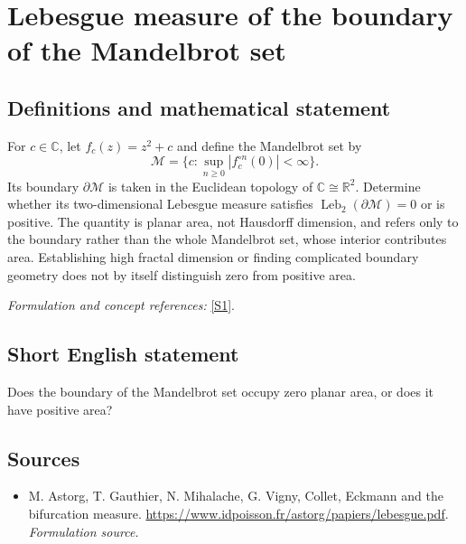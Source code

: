 \documentclass[11pt]{article}
\begin{document}
\section*{\texorpdfstring{Lebesgue measure of the boundary of the Mandelbrot set}{Lebesgue measure of the boundary of the Mandelbrot set}}\label{420}
\subsection{Definitions and mathematical statement}
For $c\in{\mathbb{C}}$, let $f_c(z)=z^2+c$ and define the Mandelbrot set by
\[
 \mathcal M=\{c:\sup_{n\ge0}|f_c^{\circ n}(0)|<\infty\}.
\]
Its boundary $\partial\mathcal M$ is taken in the Euclidean topology of ${\mathbb{C}}\cong{\mathbb{R}}^2$. Determine whether its two-dimensional Lebesgue measure satisfies $\operatorname{Leb}_2(\partial\mathcal M)=0$ or is positive. The quantity is planar area, not Hausdorff dimension, and refers only to the boundary rather than the whole Mandelbrot set, whose interior contributes area. Establishing high fractal dimension or finding complicated boundary geometry does not by itself distinguish zero from positive area.
\par\smallskip\textit{Formulation and concept references:} \href{https://www.idpoisson.fr/astorg/papiers/lebesgue.pdf}{[S1]}.

\subsection{Short English statement}
Does the boundary of the Mandelbrot set occupy zero planar area, or does it have positive area?
\subsection{Sources}
\begin{itemize}
\item[S1]M. Astorg, T. Gauthier, N. Mihalache, G. Vigny, Collet, Eckmann and the bifurcation measure.
\url{https://www.idpoisson.fr/astorg/papiers/lebesgue.pdf}.
\textit{Formulation source.}
\end{itemize}
\end{document}
